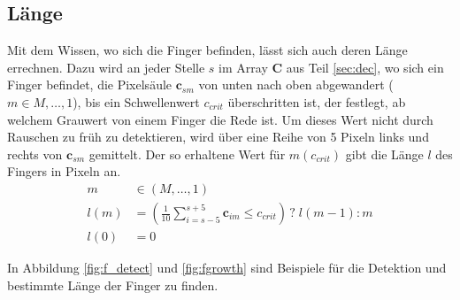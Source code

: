 \subsection{Länge}
\label{sec:lan}
Mit dem Wissen, wo sich die Finger befinden, lässt sich auch deren Länge errechnen. Dazu wird an jeder Stelle $s$ im Array $\mathbf{C}$ aus Teil \ref{sec:dec}, 
wo sich ein Finger befindet, die Pixelsäule $\mathbf{c}_{sm}$ von unten nach oben abgewandert ($m \in M, \dots, 1$), bis ein Schwellenwert $c_{crit}$ 
überschritten ist, der festlegt, ab welchem Grauwert von einem Finger die Rede ist. Um dieses Wert nicht durch Rauschen zu früh zu detektieren, wird über eine 
Reihe von 5 Pixeln links und rechts von $\mathbf{c}_{sm}$ gemittelt. Der so erhaltene Wert für $m(c_{crit})$ gibt die Länge $l$ des Fingers in Pixeln an.
\begin{align}
 m &\in (M,\dots,1) \\
 l(m) &= \left(\frac{1}{10}\sum_{i=s-5}^{s+5} \mathbf{c}_{im} \leq c_{crit} \right) \, ? \; l(m-1) : m \\
 l(0) &= 0
\end{align}

In Abbildung \ref{fig:f_detect} und \ref{fig:fgrowth} sind Beispiele für die Detektion und bestimmte Länge der Finger zu finden.


